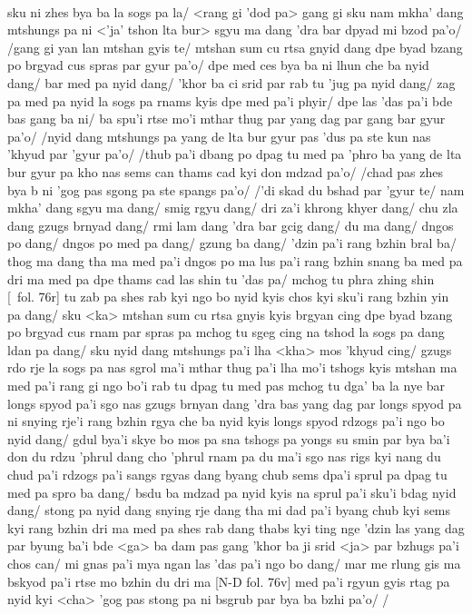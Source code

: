 \documentclass[12pt]{article}
\begin{document}
\textbf{\TVB}\\
sku ni zhes bya ba la sogs pa la/ <rang gi 'dod pa> gang gi sku nam mkha' dang mtshungs pa ni <'ja' tshon lta bur> sgyu ma dang 'dra bar dpyad mi bzod pa'o/ /gang gi yan lan mtshan gyis te/ mtshan sum cu rtsa gnyid dang dpe byad bzang po brgyad cus spras par gyur pa'o/ dpe med ces bya ba ni lhun che ba nyid dang/ bar med pa nyid dang/ 'khor ba ci srid par rab tu 'jug pa nyid dang/ zag pa med pa nyid la sogs pa rnams kyis dpe med pa'i phyir/ dpe las 'das pa'i bde bas gang ba ni/ ba spu'i rtse mo'i mthar thug par yang dag par gang bar gyur pa'o/ /nyid dang mtshungs pa yang de lta bur gyur pas 'dus pa ste kun nas 'khyud par 'gyur pa'o/ /thub pa'i dbang po dpag tu med pa 'phro ba yang de lta bur gyur pa kho nas sems can thams cad kyi don mdzad pa'o/ /chad pas zhes bya b ni 'gog pas sgong pa ste spangs pa'o/ /'di skad du bshad par 'gyur te/ nam mkha' dang sgyu ma dang/ smig rgyu dang/ dri za'i khrong khyer dang/ chu zla dang gzugs brnyad dang/ rmi lam dang 'dra bar gcig dang/ du ma dang/ dngos po dang/ dngos po med pa dang/ gzung ba dang/ 'dzin pa'i rang bzhin bral ba/ thog ma dang tha ma med pa'i dngos po ma lus pa'i rang bzhin snang ba med pa dri ma med pa dpe thams cad las shin tu 'das pa/ mchog tu phra zhing shin [\TVB\ fol. 76r] tu zab pa shes rab kyi ngo bo nyid kyis chos kyi sku'i rang bzhin yin pa dang/ sku <ka> mtshan sum cu rtsa gnyis kyis brgyan cing dpe byad bzang po brgyad cus rnam par spras pa mchog tu sgeg cing na tshod la sogs pa dang ldan pa dang/ sku nyid dang mtshungs pa'i lha <kha> mos 'khyud cing/ gzugs rdo rje la sogs pa nas sgrol ma'i mthar thug pa'i lha mo'i tshogs kyis mtshan ma med pa'i rang gi ngo bo'i rab tu dpag tu med pas mchog tu dga' ba la nye bar longs spyod pa'i sgo nas gzugs brnyan dang 'dra bas yang dag par longs spyod pa ni snying rje'i rang bzhin rgya che ba nyid kyis longs spyod rdzogs pa'i ngo bo nyid dang/ gdul bya'i skye bo mos pa sna tshogs pa yongs su smin par bya ba'i don du rdzu 'phrul dang cho 'phrul rnam pa du ma'i sgo nas rigs kyi nang du chud pa'i rdzogs pa'i sangs rgyas dang byang chub sems dpa'i sprul pa dpag tu med pa spro ba dang/ bsdu ba mdzad pa nyid kyis na sprul pa'i sku'i bdag nyid dang/ stong pa nyid dang snying rje dang tha mi dad pa'i byang chub kyi sems kyi rang bzhin dri ma med pa shes rab dang thabs kyi ting nge 'dzin las yang dag par byung ba'i bde <ga> ba dam pas gang 'khor ba ji srid <ja> par bzhugs pa'i chos can/ mi gnas pa'i mya ngan las 'das pa'i ngo bo dang/ mar me rlung gis ma bskyod pa'i rtse mo bzhin du dri ma [N-D fol. 76v] med pa'i rgyun gyis rtag pa nyid kyi <cha> 'gog pas stong pa ni bsgrub par bya ba bzhi pa'o/ /
\end{document}
